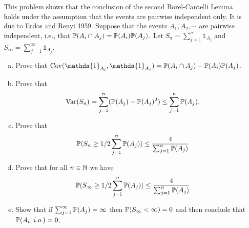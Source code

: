 \begin{problem}
	This problem shows that the conclusion of the second Borel-Cantelli Lemma holds under the assumption that the events are pairwise independent only. It is due to Erdos and Renyi 1959. Suppose that the events $ A_1,A_2,\cdots $ are pairwise independent, i.e., that $ \mathbb{P}(A_i \cap A_j) = \mathbb{P}(A_i)\mathbb{P}(A_j) $. Let $ S_n = \sum_{j=1}^{n}\mathds{1}_{A_j} $ and $ S_\infty = \sum_{j=1}^{\infty}\mathds{1}_{A_j} $.
	\begin{enumerate}[(a)]
		\item Prove that $ \operatorname{Cov}(\mathds{1}_{A_i},\mathds{1}_{A_j}) = \prob(A_i \cap A_j) - \prob(A_i)\prob(A_j) $.
		\item Prove that 
		\[ \operatorname{Var}(S_n) = \sum_{j=1}^{n}(\mathbb{P}(A_j) - \mathbb{P}(A_j)^2) \leq \sum_{j=1}^{n}\mathbb{P}(A_j). \]
		
		\item Prove that 
		\[ \mathbb{P}(S_n \geq 1/2\sum_{j=1}^{n}\mathbb{P}(A_j)) \leq \frac{4}{\sum_{j=1}^{n} \mathbb{P}(A_j)} \]
		
		\item Prove that for all $ n\in \mathbb{N} $ we have
		\[ \mathbb{P}(S_\infty \geq 1/2\sum_{j=1}^{n}\mathbb{P}(A_j)) \leq \frac{4}{\sum_{j=1}^{n} \mathbb{P}(A_j)} \]
		
		\item Show that if $ \sum_{j=1}^{\infty} \mathbb{P}(A_j)= \infty $ then $ \mathbb{P}(S_\infty <\infty) = 0 $ and then conclude that $ \mathbb{P}(A_n\ i.o.) = 0 $.
	\end{enumerate}
\end{problem}
